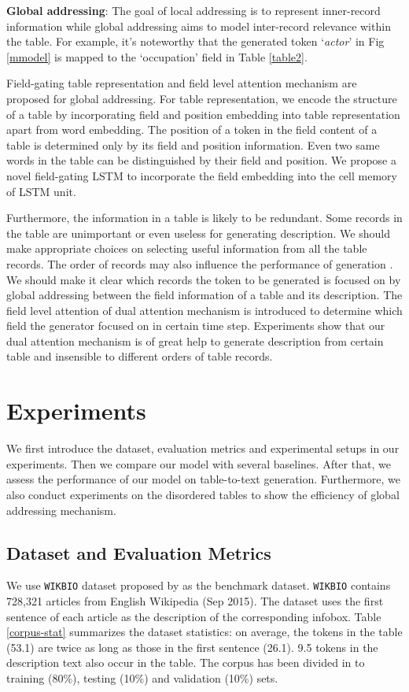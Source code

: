 \documentclass[letterpaper]{article} \usepackage{aaai18}  \usepackage{times}  \usepackage{helvet}  \usepackage{courier}  \usepackage{url}  \usepackage{graphicx}  \frenchspacing  \setlength{\pdfpagewidth}{8.5in}  \setlength{\pdfpageheight}{11in}  \usepackage{amsmath}
\begin{document}
\textbf{Global addressing}: 
The goal of local addressing is to represent inner-record information while global addressing aims to model inter-record relevance within the table.   
For example, it's noteworthy that the generated token `\textit{actor}' in Fig \ref{mmodel} is mapped to the `occupation' field in Table \ref{table2}.
  
Field-gating table representation and field level attention mechanism are proposed for global addressing.
For table representation, we encode the structure of a table by incorporating field and position embedding into table representation apart from word embedding.
The position of a token in the field content of a table is determined only by its field and position information. Even two same words in the table can be distinguished by their field and position. 
We propose a novel field-gating LSTM to incorporate the field embedding into the cell memory of LSTM unit.

Furthermore, the information in a table is likely to be redundant. Some records in the table are unimportant or even useless for generating description. We should make appropriate choices on selecting useful information from all the table records.
The order of records may also influence the performance of generation \cite{vinyals2015order}. 
We should make it clear which records the token to be generated is focused on by global addressing between the field information of a table and its description. 
The field level attention of dual attention mechanism is introduced to determine which field the generator focused on in certain time step. 
Experiments show that our dual attention mechanism is of great help to generate description from certain table and insensible to different orders of table records.  



\section{Experiments} 
We first introduce the dataset, evaluation metrics and experimental setups in our experiments. Then we compare our model with several baselines. After that, we assess the performance of our model on table-to-text generation. Furthermore, we also conduct experiments on the disordered tables to show the efficiency of global addressing mechanism.     
\subsection{Dataset and Evaluation Metrics}
We use  \texttt{WIKBIO} dataset proposed by \citeauthor{lebret2016neural}  as the benchmark dataset. \texttt{WIKBIO} contains 728,321 articles from English Wikipedia (Sep 2015). The dataset uses the first sentence of each article as the description of the corresponding infobox. Table \ref{corpus-stat} summarizes the dataset statistics: on average, the tokens in the table (53.1) are twice as long as those in the first sentence (26.1). 9.5 tokens in the description text also occur in the table. The corpus has been divided in to training (80\%), testing (10\%) and validation (10\%) sets. 
\end{document}
